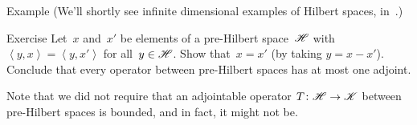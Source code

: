 \documentclass[a]{subfiles}
\begin{document}
\begin{parsec}[hilb]
\begin{point}{Example}
(We'll shortly see infinite dimensional examples of Hilbert spaces,
in~\sref{}.)
\end{point}

\begin{point}{Exercise}%
Let~$x$ and~$x'$ be elements of a pre-Hilbert space~$\mathscr{H}$
with $\left<y,x\right>=\left<y,x'\right>$
for all~$y\in\mathscr{H}$.
Show that~$x=x'$ (by taking $y=x-x'$).
Conclude that every operator between pre-Hilbert spaces
has at most one adjoint.
\end{point}
\begin{point}%
Note that we did not require that
an adjointable operator $T\colon \mathscr{H}\to\mathscr{K}$
between pre-Hilbert spaces is bounded,
and in fact, it might not be.




\end{point}
\end{parsec}
\end{document}
